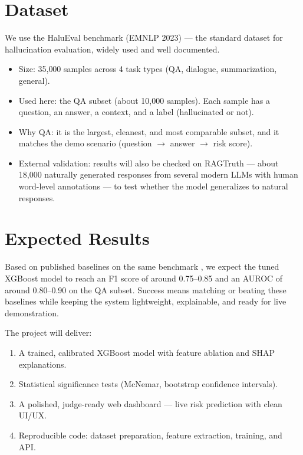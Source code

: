 \documentclass[12pt,a4paper]{article}
\begin{document}
\section{Dataset}

We use the HaluEval benchmark \cite{haluEval} (EMNLP 2023) --- the standard dataset for hallucination evaluation, widely used and well documented.

\begin{itemize}
    \item Size: 35{,}000 samples across 4 task types (QA, dialogue, summarization, general).
    \item Used here: the QA subset (about 10{,}000 samples). Each sample has a question, an answer, a context, and a label (hallucinated or not).
    \item Why QA: it is the largest, cleanest, and most comparable subset, and it matches the demo scenario (question $\rightarrow$ answer $\rightarrow$ risk score).
    \item External validation: results will also be checked on RAGTruth \cite{ragtruth} --- about 18{,}000 naturally generated responses from several modern LLMs with human word-level annotations --- to test whether the model generalizes to natural responses.
\end{itemize}

\section{Expected Results}

Based on published baselines on the same benchmark \cite{haluEval,ieeeTai}, we expect the tuned XGBoost model to reach an F1 score of around 0.75--0.85 and an AUROC of around 0.80--0.90 on the QA subset. Success means matching or beating these baselines while keeping the system lightweight, explainable, and ready for live demonstration.

The project will deliver:

\begin{enumerate}
    \item A trained, calibrated XGBoost model with feature ablation and SHAP explanations.
    \item Statistical significance tests (McNemar, bootstrap confidence intervals).
    \item A polished, judge-ready web dashboard --- live risk prediction with clean UI/UX.
    \item Reproducible code: dataset preparation, feature extraction, training, and API.
\end{enumerate}
\end{document}
